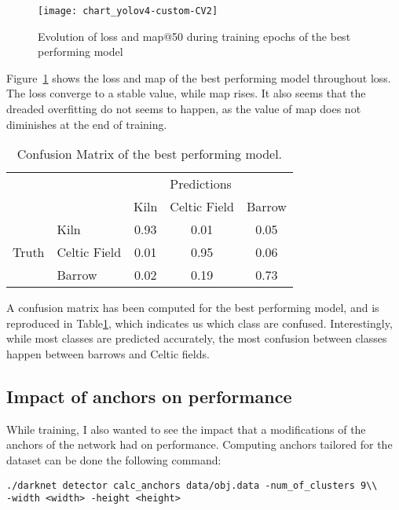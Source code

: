 \begin{figure}[h!]
	\centering
	\texttt{[image: chart\_yolov4-custom-CV2]}
	\caption[]{Evolution of loss and map@50 during training epochs of the best performing model}
	\label{fig:lossYOLO}
\end{figure}

Figure~\ref{fig:lossYOLO} shows the loss and \gls{map} of the best performing model throughout loss. The loss converge to a stable value, while \gls{map} rises. It also seems that the dreaded overfitting do not seems to happen, as the value of map does not diminishes at the end of training. 


\begin{table}[H]
	\centering
	\begin{tabular}{ll|ccc}
		&              & \multicolumn{1}{l}{} & \multicolumn{1}{l}{Predictions} & \multicolumn{1}{l}{} \\ \cline{3-5} 
								      &              & Kiln                 & Celtic Field                    & Barrow               \\ \hline
								      \multicolumn{1}{l|}{}      & Kiln         & 0.93           & 0.01                      & 0.05           \\
								      \multicolumn{1}{l|}{Truth} & Celtic Field & 0.01 & 0.95    & 0.06 \\
								      \multicolumn{1}{l|}{}      & Barrow       & 0.02 & 0.19 & 0.73
	\end{tabular}
	\caption{Confusion Matrix of the best performing model.}
	\label{tab:confMatYOLO}
\end{table}

A confusion matrix has been computed for the best performing model, and is reproduced in Table\ref{tab:confMatYOLO}, which indicates us which class are confused. Interestingly, while most classes are predicted accurately, the most confusion between classes happen between barrows and Celtic fields.  

\subsection{Impact of anchors on performance}
While training, I also wanted to see the impact that a modifications of the anchors of the network had on performance. Computing anchors tailored for the dataset can be done the following command:

\begin{verbatim}
./darknet detector calc_anchors data/obj.data -num_of_clusters 9\\
-width <width> -height <height> 
\end{verbatim}

